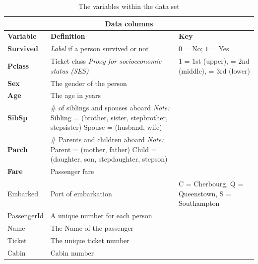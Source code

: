 \documentclass{article}
\begin{document}
\begin{table} [H]
    \begin{tabular}{ ||p{2cm}||p{6cm}|p{2.5cm}||  }
        \hline
        \multicolumn{3}{|c|}{\textbf{Data columns}} \\
        \hline
        \textbf{Variable} & \textbf{Definition} & \textbf{Key} \\
        \hline\hline
        \textbf{Survived} & \emph{Label} if a person survived or not & $0$ = No; $1$ = Yes \\ 
        \hline \hline
        \textbf{Pclass} & 
            Ticket class
            \newline
            \emph{Proxy for  socioeconomic status (SES)} &
            1 = 1st (upper), 
            \newline 2 = 2nd (middle), 
            \newline 3 = 3rd (lower) \\
        \hline
        \textbf{Sex} & The gender of the person & {} \\ 
        \hline
        \textbf{Age} & The age in years & {} \\ 
        \hline
        \textbf{SibSp} &
            \# of siblings and spouses aboard
            \newline
            \newline
            \emph{Note:} 
            Sibling = (brother, sister, stepbrother, stepsister)
            \newline
            Spouse = (husband, wife)
            & {} \\ 
        \hline
        \textbf{Parch} & 
            \# Parents and children aboard
            \newline
            \newline
            \emph{Note:} 
            Parent = (mother, father)
            \newline
            Child = (daughter, son, stepdaughter, stepson)
            & {} \\ 
        \hline
        \textbf{Fare} & Passenger fare & {} \\ 
        \hline
        Embarked & Port of embarkation & 
            C = Cherbourg,
            \newline Q = Queenstown, 
            \newline S = Southampton \\ 
        \hline
        PassengerId  & A unique number for each person &  \\
        \hline
        Name & The Name of the passenger & {} \\
        \hline
        Ticket & The unique ticket number & {} \\ 
        \hline
        Cabin & Cabin number & {} \\ 
        \hline
   \end{tabular}
   \caption{\label{tab:data-columns}The variables within the data set}
\end{table}
\end{document}
